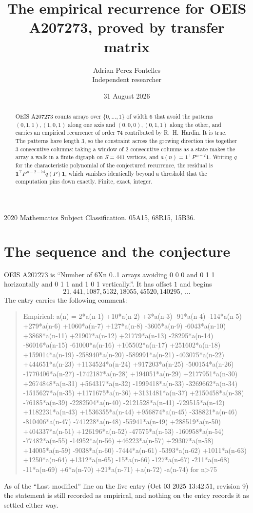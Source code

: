 \documentclass[11pt,a4paper]{article}
\title{The empirical recurrence for OEIS A207273, proved by transfer matrix}
\author{Adrian Perez Fontelles\\ \small Independent researcher}
\date{31 August 2026}
\theoremstyle{plain}
\theoremstyle{definition}
\begin{document}
\maketitle

\begin{abstract}
OEIS A207273 counts arrays over $\{0,\dots,1\}$ of width $6$ that avoid the patterns
$(0,1,1), (1,0,1)$ along one axis and $(0,0,0), (0,1,1)$ along the other, and carries an empirical recurrence of
order $74$ contributed by R.~H.~Hardin. It is true. The patterns have length $3$, so
the constraint across the growing direction ties together $3$ consecutive columns: taking a
window of $2$ consecutive columns as a state makes the array a walk in a finite digraph
on $S=441$ vertices, and $a(n)=\mathbf{1}^{\!\top}P^{\,n-2}\mathbf{1}$. Writing $q$
for the characteristic polynomial of the conjectured recurrence, the residual is
$\mathbf{1}^{\!\top}P^{\,n-2-74}q(P)\mathbf{1}$, which vanishes identically
beyond a threshold that the computation pins down exactly. Finite, exact, integer.
\end{abstract}

\noindent\small 2020 Mathematics Subject Classification. 05A15, 68R15, 15B36.\normalsize

\section{The sequence and the conjecture}

OEIS A207273 is ``Number of 6Xn 0..1 arrays avoiding 0 0 0 and 0 1 1 horizontally and 0 1 1 and 1 0 1 vertically.''. It has offset
$1$ and begins
\[
21, 441, 1087, 5132, 18055, 45520, 140295,\ \dots
\]
The entry carries the following comment:
\begin{quote}\small
Empirical: a(n) = 2*a(n-1) +10*a(n-2) +3*a(n-3) -91*a(n-4) -114*a(n-5) +279*a(n-6) +1060*a(n-7) +127*a(n-8) -3605*a(n-9) -6043*a(n-10) +3868*a(n-11) +21907*a(n-12) +21779*a(n-13) -28295*a(n-14) -86016*a(n-15) -61000*a(n-16) +105502*a(n-17) +251602*a(n-18) +159014*a(n-19) -258940*a(n-20) -589991*a(n-21) -403075*a(n-22) +444651*a(n-23) +1134524*a(n-24) +917203*a(n-25) -500154*a(n-26) -1770406*a(n-27) -1742187*a(n-28) +194051*a(n-29) +2177951*a(n-30) +2674848*a(n-31) +564317*a(n-32) -1999418*a(n-33) -3269662*a(n-34) -1515627*a(n-35) +1171675*a(n-36) +3131481*a(n-37) +2150458*a(n-38) -76185*a(n-39) -2282504*a(n-40) -2121528*a(n-41) -729515*a(n-42) +1182231*a(n-43) +1536355*a(n-44) +956874*a(n-45) -338821*a(n-46) -810406*a(n-47) -741228*a(n-48) -55941*a(n-49) +288519*a(n-50) +404337*a(n-51) +126196*a(n-52) -47575*a(n-53) -160958*a(n-54) -77482*a(n-55) -14952*a(n-56) +46223*a(n-57) +29307*a(n-58) +14005*a(n-59) -9038*a(n-60) -7444*a(n-61) -5393*a(n-62) +1011*a(n-63) +1250*a(n-64) +1312*a(n-65) -15*a(n-66) -127*a(n-67) -211*a(n-68) -11*a(n-69) +6*a(n-70) +21*a(n-71) +a(n-72) -a(n-74) for n>75
\end{quote}
As of the ``Last modified'' line on the live entry (Oct 03 2025 13:42:51, revision
9) the statement is still recorded as empirical, and nothing on the entry
records it as settled either way.
\end{document}
